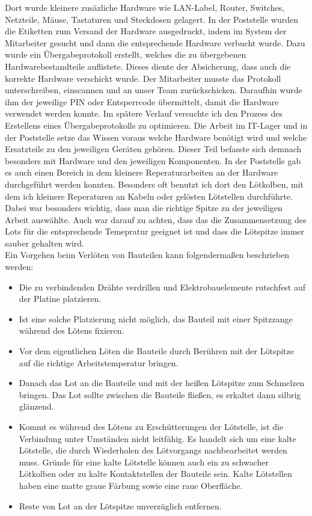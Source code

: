 Dort wurde kleinere zusäzliche Hardware wie LAN-Label, Router, Switches, Netzteile, Mäuse, Tastaturen und Steckdosen gelagert. In der Poststelle wurden die Etiketten zum Versand der Hardware ausgedruckt, indem im System der Mitarbeiter gesucht und dann die entsprechende Hardware verbucht wurde. Dazu wurde ein Übergabeprotokoll erstellt, welches die zu übergebenen Hardwarebestandteile auflistete. Dieses diente der Absicherung, dass auch die korrekte Hardware verschickt wurde. Der Mitarbeiter musste das Protokoll unterschreiben, einscannen und an unser Team zurückschicken. Daraufhin wurde ihm der jeweilige PIN oder Entsperrcode übermittelt, damit die Hardware verwendet werden konnte. Im spätere Verlauf versuchte ich den Prozess des Erstellens eines Übergabeprotokolls zu optimieren. Die Arbeit im IT-Lager und in der Poststelle setze das Wissen voraus welche Hardware benötigt wird und welche Ersatzteile zu den jeweiligen Geräten gehören. Dieser Teil befasste sich demnach besonders mit Hardware und den jeweiligen Komponenten. In der Poststelle gab es auch einen Bereich in dem kleinere Reperaturarbeiten an der Hardware durchgeführt werden konnten. Besonders oft benutzt ich dort den Lötkolben, mit dem ich kleinere Reperaturen an Kabeln oder gelösten Lötstellen durchführte. Dabei war besonders wichtig, dass man die richtige Spitze zu der jeweiligen Arbeit auswählte. Auch war darauf zu achten, dass das die Zusammensetzung des Lots für die entsprechende Temepratur geeignet ist und dass die Lötspitze immer sauber gehalten wird.
\\
 Ein Vorgehen beim Verlöten von Bauteilen kann folgendermaßen beschrieben werden:
\\
\begin{itemize}
	\item Die zu verbindenden Drähte verdrillen und Elektrobauelemente rutschfest auf der Platine platzieren.
	\item Ist eine solche Platzierung nicht möglich, das Bauteil mit einer Spitzzange während des Lötens fixieren.
	\item Vor dem eigentlichen Löten die Bauteile durch Berühren mit der Lötspitze auf die richtige Arbeitstemperatur bringen.
	\item Danach das Lot an die Bauteile und mit der heißen Lötspitze zum Schmelzen bringen. Das Lot sollte zwischen die Bauteile fließen, es erkaltet dann silbrig glänzend.
	\item Kommt es während des Lötens zu Erschütterungen der Lötstelle, ist die Verbindung unter Umständen nicht leitfähig. Es handelt sich um eine kalte Lötstelle, die durch Wiederholen des Lötvorgangs nachbearbeitet werden muss. Gründe für eine kalte Lötstelle können auch ein zu schwacher Lötkolben oder zu kalte Kontaktstellen der Bauteile sein. Kalte Lötstellen haben 			eine matte graue Färbung sowie eine raue Oberfläche.
	\item Reste von Lot an der Lötspitze unverzüglich entfernen.
\end{itemize}
